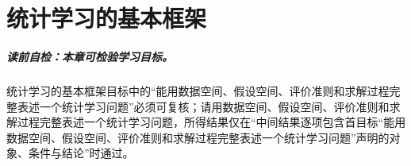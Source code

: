 
\chapter{统计学习的基本框架}\label{chap:V1-C09}


\paragraph{读前自检：本章可检验学习目标。}统计学习的基本框架目标中的“能用数据空间、假设空间、评价准则和求解过程完整表述一个统计学习问题”必须可复核；请用数据空间、假设空间、评价准则和求解过程完整表述一个统计学习问题，所得结果仅在“中间结果逐项包含首目标“能用数据空间、假设空间、评价准则和求解过程完整表述一个统计学习问题”声明的对象、条件与结论”时通过。\par

